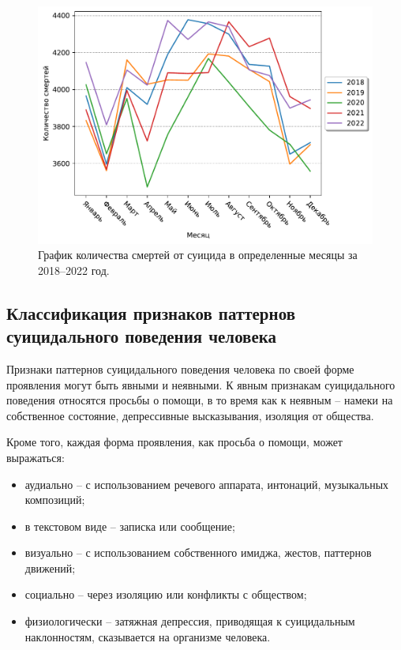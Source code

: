 \begin{figure}[H]
	\centering
	\includegraphics[width=\textwidth]{inc/deathToMonth.pdf}
	\caption{ График количества смертей от суицида в определенные месяцы за 2018--2022 год. }
	\label{img:cdcsuicides}
\end{figure}


\subsection{Классификация признаков паттернов суицидального поведения человека}

Признаки паттернов суицидального поведения человека по своей форме проявления могут быть явными и неявными. К явным признакам суицидального поведения относятся просьбы о помощи, в то время как к неявным -- намеки на собственное состояние, депрессивные высказывания, изоляция от общества.

Кроме того, каждая форма проявления, как просьба о помощи, может выражаться:

\begin{itemize}
	\item аудиально -- с использованием речевого аппарата, интонаций, музыкальных композиций;
	\item в текстовом виде -- записка или сообщение;
	\item визуально -- с использованием собственного имиджа, жестов, паттернов движений;
	\item социально -- через изоляцию или конфликты с обществом;
	\item физиологически -- затяжная депрессия, приводящая к суицидальным наклонностям, сказывается на организме человека.
\end{itemize}


